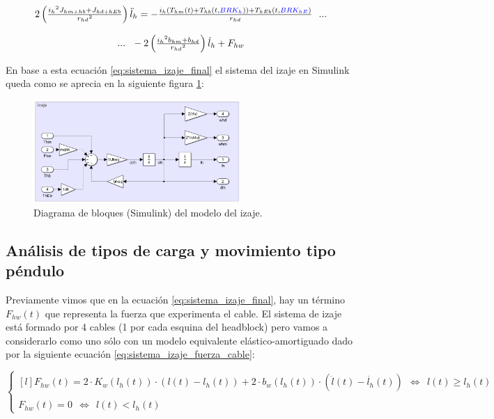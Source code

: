 \documentclass[11pt]{article}
\begin{document}
\begin{equation}
	\label{eq:sistema_izaje_final}
	\begin{matrix}
		2\left ( \frac{{i_{h}}^{2}J_{hm+hb}+J_{hd+hEb}}{{r_{hd}}^{2}} \right )\ddot{l}_{h}=-\frac{i_{h}\left ( T_{hm}(t)+T_{hb}(t,{\color{blue}BRK_{h}}) \right )+T_{hEb}(t,{\color{blue}BRK_{hE}})}{r_{hd}}\ \ ...
		\\
		\\
		...\ \ -2\left ( \frac{{i_{h}}^{2}b_{hm}+b_{hd}}{{r_{hd}}^{2}} \right )\dot{l}_{h}+F_{hw}
	\end{matrix}
\end{equation}

En base a esta ecuación \ref{eq:sistema_izaje_final} el sistema del izaje en Simulink queda como se aprecia en la siguiente figura \ref{fig:sistema_izaje_simulink}:

\begin{figure}[h!]
	\centering
	\includegraphics[width=0.7\textwidth]{images/imagen_6_simulink_izaje.png}
	\caption{Diagrama de bloques (Simulink) del modelo del izaje.}
	\label{fig:sistema_izaje_simulink}
\end{figure}

\newpage

\subsection{Análisis de tipos de carga y movimiento tipo péndulo}
\label{section:carga}

Previamente vimos que en la ecuación \ref{eq:sistema_izaje_final}, hay un término $F_{hw}(t)$ que representa la fuerza que experimenta el cable. El sistema de izaje está formado por 4 cables (1 por cada esquina del headblock) pero vamos a considerarlo como uno sólo con un modelo equivalente elástico-amortiguado dado por la siguiente ecuación \ref{eq:sistema_izaje_fuerza_cable}:

\begin{equation}
	\label{eq:sistema_izaje_fuerza_cable}
	\left\{
		\begin{matrix*}[l]
		F_{hw}(t)=2\cdot K_{w}\left ( l_{h}(t) \right )\cdot \left ( l(t)-l_{h}(t) \right )+2\cdot b_{w}\left ( l_{h}(t) \right )\cdot ( \dot{l}(t)-\dot{l_{h}}(t) ) \ \ \Leftrightarrow\ \ l(t)\geq l_{h}(t)
		\\
		\\ 
		F_{hw}(t)= 0\ \ \Leftrightarrow\ \ l(t)<l_{h}(t)
		\end{matrix*}
	\right.
\end{equation}
\end{document}
